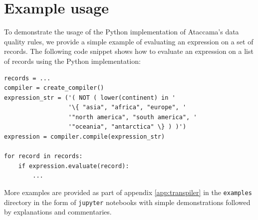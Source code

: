 \section{Example usage}

To demonstrate the usage of the Python implementation of Ataccama's data quality rules, we provide a simple example of evaluating an expression on a set of records. The following code snippet shows how to evaluate an expression on a list of records using the Python implementation:

\begin{verbatim}
records = ...
compiler = create_compiler()
expression_str = ('( NOT ( lower(continent) in '
                  '\{ "asia", "africa", "europe", '
                  '"north america", "south america", '
                  '"oceania", "antarctica" \} ) )')
expression = compiler.compile(expression_str)

for record in records:
    if expression.evaluate(record):
        ...
\end{verbatim}


More examples are provided as part of appendix \ref{app:transpiler} in the \texttt{examples} directory in the form of \texttt{jupyter} \cite{jupyter} notebooks with simple demonstrations followed by explanations and commentaries. 